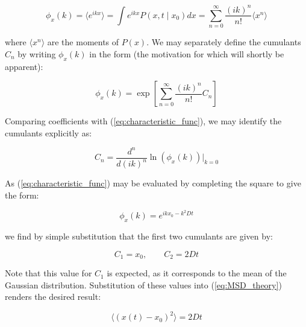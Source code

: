 \documentclass[11pt, a4paper]{article} %
\begin{document}
\begin{appendices}
\begin{equation} \label{eq:characteristic_func}
\phi_{x}(k) = \langle e^{ikx} \rangle = \int e^{ikx} P(x,t \mid x_{0}) dx = \sum_{n=0}^{\infty} \frac{(ik)^{n}}{n!}\langle x^{n} \rangle
\end{equation}

where $\langle x^{n} \rangle$ are the moments of $P(x)$. We may separately define the cumulants $C_{n}$ by writing $\phi_{x}(k)$ in the form (the motivation for which will shortly be apparent):

\begin{equation}
\phi_{x}(k) =  \exp \left[\sum_{n=0}^{\infty} \frac{(ik)^{n}}{n!} C_{n}  \right]
\end{equation}

Comparing coefficients with (\ref{eq:characteristic_func}), we may identify the cumulants explicitly as:

\begin{equation}
C_{n} = \frac{d^{n}}{d(ik)^{n}} \ln \left(\phi_{x}(k) \right) \biggr|_{k=0} 
\end{equation}

As (\ref{eq:characteristic_func}) may be evaluated by completing the square to give the form:

\begin{equation}
\phi_{x}(k) = e^{ikx_{0} - k^{2}Dt}
\end{equation}

we find by simple substitution that the first two cumulants are given by:

\begin{equation}
C_{1} = x_{0}, \qquad C_{2} = 2Dt
\end{equation}

Note that this value for $C_{1}$ is expected, as it corresponds to the mean of the Gaussian distribution. Substitution of these values into (\ref{eq:MSD_theory}) renders the desired result:

\begin{equation}
\langle (x(t) - x_{0})^{2} \rangle = 2Dt
\end{equation}


\end{appendices}
\end{document}
